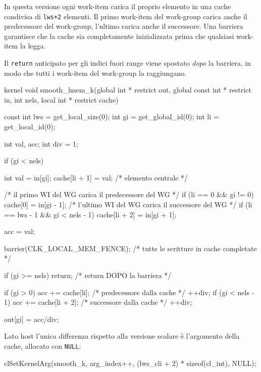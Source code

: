 In questa versione ogni work-item carica il proprio elemento in una cache condivisa di \texttt{lws+2} elementi. Il primo work-item del work-group carica anche il predecessore del work-group, l'ultimo carica anche il successore. Una barriera garantisce che la cache sia completamente inizializzata prima che qualsiasi work-item la legga.

Il \texttt{return} anticipato per gli indici fuori range viene spostato \emph{dopo} la barriera, in modo che tutti i work-item del work-group la raggiungano.

\begin{code}[caption={Kernel smooth con local memory}, label={code:smooth_lmem_k}]
kernel void smooth_lmem_k(global int * restrict out,
                          global const int * restrict in,
                          int nels,
                          local int * restrict cache)
{
    const int lws = get_local_size(0);
    int gi = get_global_id(0);
    int li = get_local_id(0);

    int val, acc;
    int div = 1;

    if (gi < nels) {
        int val = in[gi];
        cache[li + 1] = val; /* elemento centrale */

        /* il primo WI del WG carica il predecessore del WG */
        if (li == 0 && gi != 0)
            cache[0] = in[gi - 1];
        /* l'ultimo WI del WG carica il successore del WG */
        if (li == lws - 1 && gi < nels - 1)
            cache[li + 2] = in[gi + 1];

        acc = val;
    }

    barrier(CLK_LOCAL_MEM_FENCE); /* tutte le scritture in cache completate */

    if (gi >= nels) return; /* return DOPO la barriera */

    if (gi > 0) {
        acc += cache[li];     /* predecessore dalla cache */
        ++div;
    }
    if (gi < nels - 1) {
        acc += cache[li + 2]; /* successore dalla cache */
        ++div;
    }

    out[gi] = acc/div;
}
\end{code}

Lato host l'unica differenza rispetto alla versione scalare è l'argomento della cache, allocato con \texttt{NULL}:

\begin{code}[caption={Allocazione della cache lato host (versione lmem)}, label={code:smooth_host_lmem}]
clSetKernelArg(smooth_k, arg_index++,
               (lws_cli + 2) * sizeof(cl_int), NULL);
\end{code}

